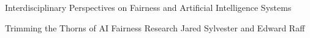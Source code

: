 \documentclass[11pt]{article}
\begin{document}
\begin{bulletin}
\begin{articlesection}{Interdisciplinary Perspectives on Fairness and Artificial Intelligence Systems}
%
\begin{article}
{Trimming the Thorns of AI Fairness Research}
{Jared Sylvester and Edward Raff}
\graphicspath{{submissions/sylvester_raff_final/}}

\end{article}

\end{articlesection}




%
%



\begin{callsection}


\end{callsection}
\end{bulletin}
\end{document}
